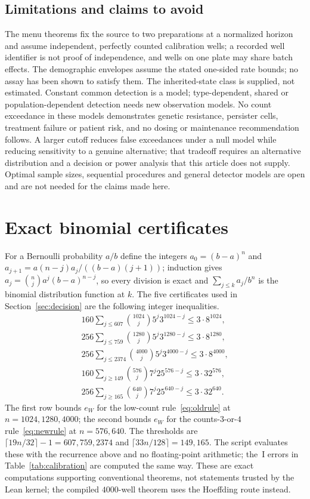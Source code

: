 \documentclass[11pt,a4paper]{article}
\theoremstyle{plain}
\theoremstyle{definition}
\theoremstyle{remark}
\begin{document}
\subsection{Limitations and claims to avoid}
The menu theorems fix the source to two preparations at a normalized horizon and assume independent, perfectly counted calibration wells; a recorded well identifier is not proof of independence, and wells on one plate may share batch effects. The demographic envelopes assume the stated one-sided rate bounds; no assay has been shown to satisfy them. The inherited-state class is supplied, not estimated. Constant common detection is a model; type-dependent, shared or population-dependent detection needs new observation models. No count exceedance in these models demonstrates genetic resistance, persister cells, treatment failure or patient risk, and no dosing or maintenance recommendation follows. A larger cutoff reduces false exceedances under a null model while reducing sensitivity to a genuine alternative; that tradeoff requires an alternative distribution and a decision or power analysis that this article does not supply. Optimal sample sizes, sequential procedures and general detector models are open and are not needed for the claims made here.

\FloatBarrier
\appendix

\section{Exact binomial certificates}\label{app:binomial}
For a Bernoulli probability $a/b$ define the integers $a_0=(b-a)^n$ and $a_{j+1}=a(n-j)a_j/((b-a)(j+1))$; induction gives $a_j=\binom nja^j(b-a)^{n-j}$, so every division is exact and $\sum_{j\le k}a_j/b^n$ is the binomial distribution function at $k$. The five certificates used in Section~\ref{sec:decision} are the following integer inequalities.
{\allowdisplaybreaks
\begin{gather*}
160\sum_{j\le607}\binom{1024}{j}5^j3^{1024-j}\le3\cdot8^{1024},\\
256\sum_{j\le759}\binom{1280}{j}5^j3^{1280-j}\le3\cdot8^{1280},\\
256\sum_{j\le2374}\binom{4000}{j}5^j3^{4000-j}\le3\cdot8^{4000},\\
160\sum_{j\ge149}\binom{576}{j}7^j25^{576-j}\le3\cdot32^{576},\\
256\sum_{j\ge165}\binom{640}{j}7^j25^{640-j}\le3\cdot32^{640}.
\end{gather*}}
The first row bounds $e_W$ for the low-count rule~\eqref{eq:oldrule} at $n=1024,1280,4000$; the second bounds $e_W$ for the counts-$3$-or-$4$ rule~\eqref{eq:newrule} at $n=576,640$. The thresholds are $\lceil19n/32\rceil-1=607,759,2374$ and $\lceil33n/128\rceil=149,165$. The script evaluates these with the recurrence above and no floating-point arithmetic; the~I errors in Table~\ref{tab:calibration} are computed the same way. These are exact computations supporting conventional theorems, not statements trusted by the Lean kernel; the compiled $4000$-well theorem uses the Hoeffding route instead.
\end{document}
